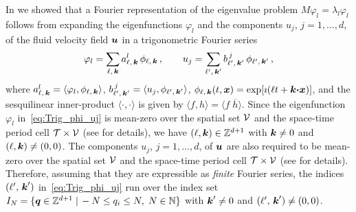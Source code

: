 \documentclass[amsa]{ipart}
\begin{document}
In  we showed that a Fourier
representation of the eigenvalue problem $M\varphi_l=\lambda_l\varphi_l$ follows from
expanding the eigenfunctions $\varphi_l$ and the components $u_j$,
$j=1,\ldots,d$, of the fluid velocity field $\boldsymbol{u}$ in a trigonometric
Fourier series   
%
\begin{align}\label{eq:Trig_phi_uj}
  \varphi_l=\sum_{\ell,\,\veck}a^l_{\ell,\,\veck}\,\phi_{\ell,\,\veck}\,,
  \qquad
  u_j=\sum_{\ell^\prime,\,\veck^\prime}b^{\,j}_{\ell^\prime,\,\veck^\prime}\,\phi_{\ell^\prime,\,\veck^\prime}\,,
\end{align}
%
where $a^l_{\ell,\,\boldsymbol{k}}=\langle\varphi_l,\phi_{\ell,\,\boldsymbol{k}}\rangle$,
$b^{\,j}_{\ell^\prime,\,\boldsymbol{k}^\prime}=\langle u_j,\phi_{\ell^\prime,\,\boldsymbol{k}^\prime}\rangle$,
$\phi_{\ell,\,\boldsymbol{k}}(t,\boldsymbol{x})=\exp[\imath(\ell t+\boldsymbol{k}\mbox{\boldmath${\cdot}$}\boldsymbol{x})]$, and the sesquilinear
inner-product $\langle\cdot,\cdot\rangle$ is given by $\langle f,h\rangle=\langle f\;\overline{h}\rangle$. Since
the eigenfunction $\varphi_l$ in~\eqref{eq:Trig_phi_uj} is mean-zero over the
spatial set $\mathcal{V}$ and the space-time period cell $\mathcal{T}\times\mathcal{V}$ (see
 for details), we 
have $(\ell,\boldsymbol{k})\in\mathbb{Z}^{d+1}$ with $\boldsymbol{k}\neq0$ and
$(\ell,\boldsymbol{k})\neq(0,0)$. The components $u_j$, $j=1,\ldots,d$, of $\boldsymbol{u}$ are
also required to be mean-zero over the spatial set $\mathcal{V}$ and the
space-time period cell $\mathcal{T}\times\mathcal{V}$ (see  for
details). Therefore, assuming that they are expressible as
\emph{finite} Fourier series, the indices $(\ell^\prime,\,\boldsymbol{k}^\prime)$
in~\eqref{eq:Trig_phi_uj} run over the index set
$I_N=\{\boldsymbol{q}\in\mathbb{Z}^{d+1} \;|\, -N\leq q_i\leq N,  \;N\in\mathbb{N}\}$
with $\boldsymbol{k}^\prime\neq0$ and  $(\ell^\prime,\,\boldsymbol{k}^\prime)\neq(0,0)$.
\end{document}
